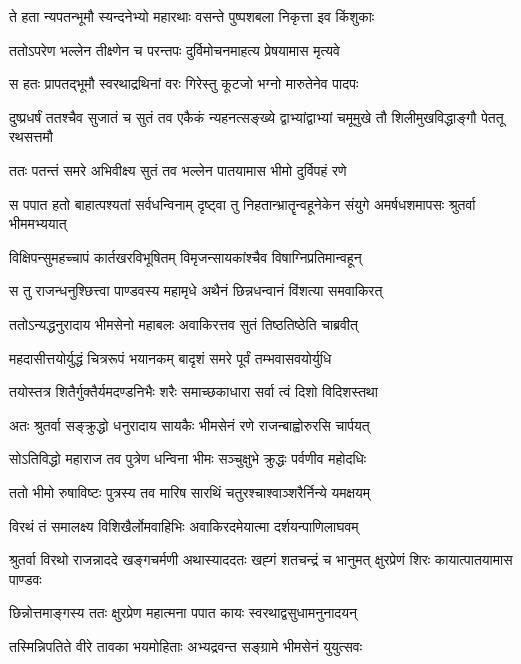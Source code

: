 \twolineshloka
{ते हता न्यपतन्भूमौ स्यन्दनेभ्यो महारथाः}
{वसन्ते पुष्पशबला निकृत्ता इव किंशुकाः}


\twolineshloka
{ततोऽपरेण भल्लेन तीक्ष्णेन च परन्तपः}
{दुर्विमोचनमाहत्य प्रेषयामास मृत्यवे}


\twolineshloka
{स हतः प्रापतद्भूमौ स्वरथाद्रथिनां वरः}
{गिरेस्तु कूटजो भग्नो मारुतेनेव पादपः}


\threelineshloka
{दुष्प्रधर्षं ततश्चैव सुजातं च सुतं तव}
{एकैकं न्यहनत्सङ्ख्ये द्वाभ्यांद्वाभ्यां चमूमुखे}
{तौ शिलीमुखविद्धाङ्गौ पेततू रथसत्तमौ}


\twolineshloka
{ततः पतन्तं समरे अभिवीक्ष्य सुतं तव}
{भल्लेन पातयामास भीमो दुर्विपहं रणे}


स पपात हतो बाहात्पश्यतां सर्वधन्विनाम्
\twolineshloka
{दृष्ट्वा तु निहतान्भ्रातॄन्वहूनेकेन संयुगे}
{अमर्षधशमापसः श्रुतर्वा भीममभ्ययात्}


\twolineshloka
{विक्षिपन्सुमहच्चापं कार्तखरविभूषितम्}
{विमृजन्सायकांश्चैव विषाग्निप्रतिमान्वहून्}


\twolineshloka
{स तु राजन्धनुश्छित्त्वा पाण्डवस्य महामृधे}
{अथैनं छिन्नधन्वानं विंशत्या समवाकिरत्}


\twolineshloka
{ततोऽन्यद्धनुरादाय भीमसेनो महाबलः}
{अवाकिरत्तव सुतं तिष्ठतिष्ठेति चाब्रवीत्}


\twolineshloka
{महदासीत्तयोर्युद्धं चित्ररूपं भयानकम्}
{बादृशं समरे पूर्वं तम्भवासवयोर्युधि}


\twolineshloka
{तयोस्तत्र शितैर्गुक्तैर्यमदण्डनिभैः शरैः}
{समाच्छकाधारा सर्वा त्वं दिशो विदिशस्तथा}


\twolineshloka
{अतः श्रुतर्वा सङ्क्रुद्धो धनुरादाय सायकैः}
{भीमसेनं रणे राजन्बाह्वोरुरसि चार्पयत्}


\twolineshloka
{सोऽतिविद्धो महाराज तव पुत्रेण धन्विना}
{भीमः सञ्चुक्षुभे क्रुद्धः पर्वणीव महोदधिः}


\twolineshloka
{ततो भीमो रुषाविष्टः पुत्रस्य तव मारिष}
{सारथिं चतुरश्चाश्वाञ्शरैर्निन्ये यमक्षयम्}


\twolineshloka
{विरथं तं समालक्ष्य विशिखैर्लोमवाहिभिः}
{अवाकिरदमेयात्मा दर्शयन्पाणिलाघवम्}


\threelineshloka
{श्रुतर्वा विरथो राजन्नाददे खङ्गचर्मणी}
{अथास्याददतः खह्गं शतचन्द्रं च भानुमत्}
{क्षुरप्रेणं शिरः कायात्पातयामास पाण्डवः}


\twolineshloka
{छिन्नोत्तमाङ्गस्य ततः क्षुरप्रेण महात्मना}
{पपात कायः स्वरथाद्वसुधामनुनादयन्}


\twolineshloka
{तस्मिन्निपतिते वीरे तावका भयमोहिताः}
{अभ्यद्रवन्त सङ्ग्रामे भीमसेनं युयुत्सवः}



